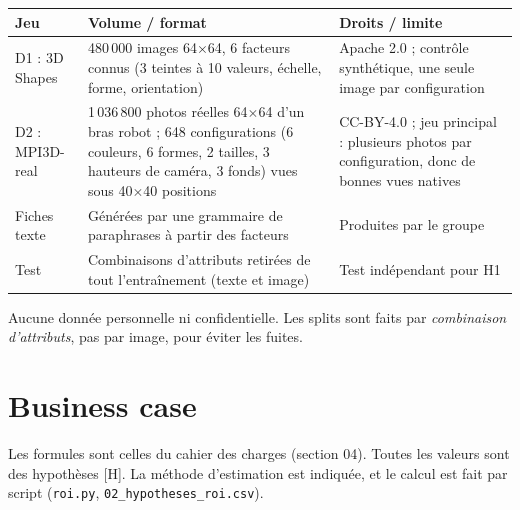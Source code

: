 \documentclass[10pt,a4paper]{article}
\begin{document}
\begin{center}\small
\begin{tabularx}{\textwidth}{@{}P{2.2cm}LL@{}}
\toprule
Jeu & Volume / format & Droits / limite \\
\midrule
D1 : 3D Shapes & 480\,000 images 64$\times$64, 6 facteurs connus (3 teintes à 10 valeurs, échelle, forme, orientation) & Apache 2.0 ; contrôle synthétique, une seule image par configuration \\
D2 : MPI3D-real & 1\,036\,800 photos réelles 64$\times$64 d'un bras robot ; 648 configurations (6 couleurs, 6 formes, 2 tailles, 3 hauteurs de caméra, 3 fonds) vues sous 40$\times$40 positions & CC-BY-4.0 ; jeu principal : plusieurs photos par configuration, donc de bonnes vues natives \\
Fiches texte & Générées par une grammaire de paraphrases à partir des facteurs & Produites par le groupe \\
Test & Combinaisons d'attributs retirées de tout l'entraînement (texte et image) & Test indépendant pour H1 \\
\bottomrule
\end{tabularx}
\end{center}
Aucune donnée personnelle ni confidentielle. Les splits sont faits par \emph{combinaison d'attributs}, pas par image, pour éviter les fuites.

\section{Business case}

Les formules sont celles du cahier des charges (section 04). Toutes les valeurs sont des hypothèses [H]. La méthode d'estimation est indiquée, et le calcul est fait par script (\texttt{roi.py}, \texttt{02\_hypotheses\_roi.csv}).
\end{document}
